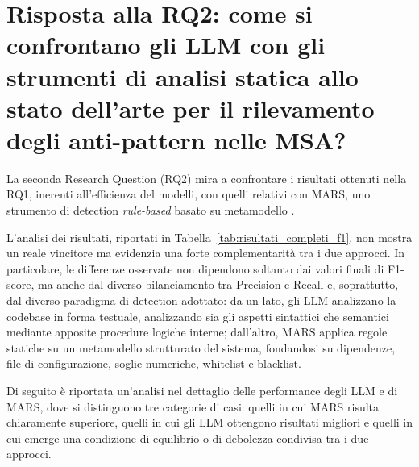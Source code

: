\section{Risposta alla RQ2: come si confrontano gli LLM con gli strumenti di analisi statica allo stato dell’arte per il rilevamento degli anti-pattern nelle MSA?}

La seconda Research Question (RQ2) mira a confrontare i risultati ottenuti nella RQ1, inerenti all'efficienza del modelli, con quelli relativi con MARS, uno strumento di detection \textit{rule-based} basato su metamodello \cite{MARS}.

L’analisi dei risultati, riportati in Tabella~\ref{tab:risultati_completi_f1}, non mostra un reale vincitore ma evidenzia una forte complementarità tra i due approcci. In particolare, le differenze osservate non dipendono soltanto dai valori finali di F1-score, ma anche dal diverso bilanciamento tra Precision e Recall e, soprattutto, dal diverso paradigma di detection adottato: da un lato, gli LLM analizzano la codebase in forma testuale, analizzando sia gli aspetti sintattici che semantici mediante apposite procedure logiche interne; dall’altro, MARS applica regole statiche su un metamodello strutturato del sistema, fondandosi su dipendenze, file di configurazione, soglie numeriche, whitelist e blacklist.

Di seguito è riportata un'analisi nel dettaglio delle performance degli LLM e di MARS, dove si distinguono tre categorie di casi: quelli in cui MARS risulta chiaramente superiore, quelli in cui gli LLM ottengono risultati migliori e quelli in cui emerge una condizione di equilibrio o di debolezza condivisa tra i due approcci.

